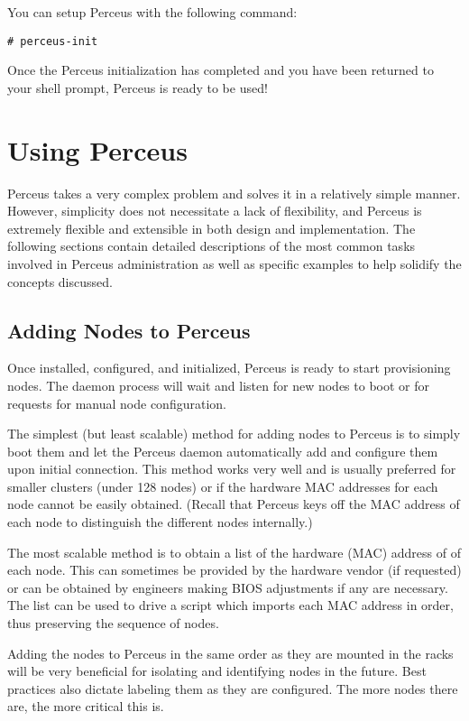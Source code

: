 \documentclass[10pt,letterpaper]{report}
\begin{document}
You can setup Perceus with the following command:

\begin{verbatim}
# perceus-init
\end{verbatim}

Once the Perceus initialization has completed and you have been returned to
your shell prompt, Perceus is ready to be used!

\chapter{Using Perceus}

Perceus takes a very complex problem and solves it in a relatively simple
manner.  However, simplicity does not necessitate a lack of flexibility, and
Perceus is extremely flexible and extensible in both design and
implementation.  The following sections contain detailed descriptions of the
most common tasks involved in Perceus administration as well as specific
examples to help solidify the concepts discussed.

\section{Adding Nodes to Perceus}

Once installed, configured, and initialized, Perceus is ready to start
provisioning nodes.  The daemon process will wait and listen for new nodes to
boot or for requests for manual node configuration.

The simplest (but least scalable) method for adding nodes to Perceus is to
simply boot them and let the Perceus daemon automatically add and configure
them upon initial connection.  This method works very well and is usually
preferred for smaller clusters (under 128 nodes) or if the hardware MAC
addresses for each node cannot be easily obtained.  (Recall that Perceus keys
off the MAC address of each node to distinguish the different nodes
internally.)

The most scalable method is to obtain a list of the hardware (MAC) address of
of each node.  This can sometimes be provided by
the hardware vendor (if requested) or can be obtained by engineers making BIOS
adjustments if any are necessary.  The list can be used to drive a script
which imports each MAC address in order, thus preserving the sequence of
nodes.

Adding the nodes to Perceus in the same order as they are mounted in the racks
will be very beneficial for isolating and identifying nodes in the future.
Best practices also dictate labeling them as they are configured.  The more
nodes there are, the more critical this is.
\end{document}
